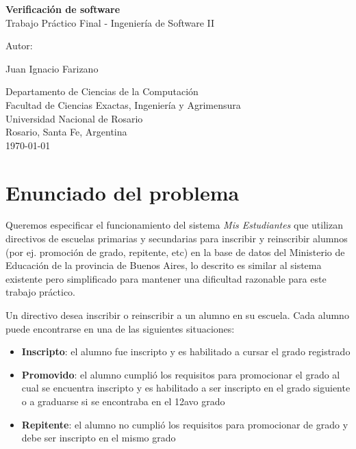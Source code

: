 \documentclass{article}
\begin{document}
\begin{titlepage}
  \thispagestyle{empty}
  \begin{center}
    
    {\huge \textbf{Verificación de software} \\[0.4cm]}
    {\large Trabajo Práctico Final - Ingeniería de Software II} \\
    \noindent
    
    \vfill
    \vfill
    \vfill
    {\Large Autor: \par}
    {\Large Juan Ignacio Farizano\par}
  
    \vfill
    Departamento de Ciencias de la Computaci\'on\\
    Facultad de Ciencias Exactas, Ingenier\'ia y Agrimensura\\
    Universidad Nacional de Rosario \\
    Rosario, Santa Fe, Argentina\\[0.4cm]
    {\large \today} 
  \end{center}
  \end{titlepage}

\section{Enunciado del problema}
Queremos especificar el funcionamiento del sistema \emph{Mis Estudiantes} que utilizan directivos de escuelas primarias y secundarias para inscribir y reinscribir alumnos (por ej. promoción de grado, repitente, etc) en la base de datos del Ministerio de Educación de la provincia de Buenos Aires, lo descrito es similar al sistema existente pero simplificado para mantener una dificultad razonable para este trabajo práctico.

Un directivo desea inscribir o reinscribir a un alumno en su escuela. Cada alumno puede encontrarse en una de las siguientes situaciones:

\begin{itemize}
  \item \textbf{Inscripto}: el alumno fue inscripto y es habilitado a cursar el grado registrado
  \item \textbf{Promovido}: el alumno cumplió los requisitos para promocionar el grado al cual se encuentra inscripto y es habilitado a ser inscripto en el grado siguiente o a graduarse si se encontraba en el 12avo grado
  \item \textbf{Repitente}: el alumno no cumplió los requisitos para promocionar de grado y debe ser inscripto en el mismo grado
\end{itemize}
\end{document}
